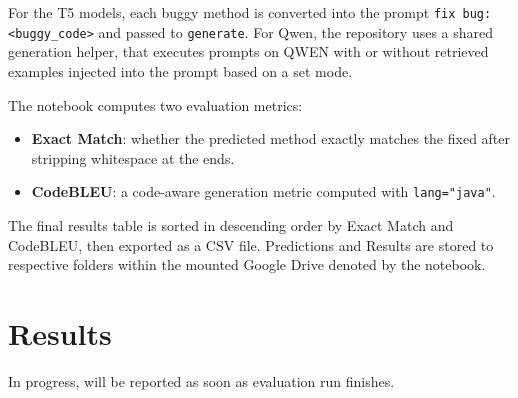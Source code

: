 \documentclass[11pt]{article}
\begin{document}
For the T5 models, each buggy method is converted into the prompt \texttt{fix bug: <buggy\_code>} and passed to \texttt{generate}. For Qwen, the repository uses a shared generation helper, that executes prompts on QWEN with or without retrieved examples injected into the prompt based on a set mode. 

The notebook computes two evaluation metrics:
\begin{itemize}[leftmargin=*]
\item \textbf{Exact Match}: whether the predicted method exactly matches the fixed  after stripping whitespace at the ends.
\item \textbf{CodeBLEU}: a code-aware generation metric computed with \texttt{lang="java"}.
\end{itemize}
The final results table is sorted in descending order by Exact Match and CodeBLEU, then exported as a CSV file. Predictions and Results are stored to respective folders within the mounted Google Drive denoted by the notebook.

\section{Results}
In progress, will be reported as soon as evaluation run finishes.
\end{document}
